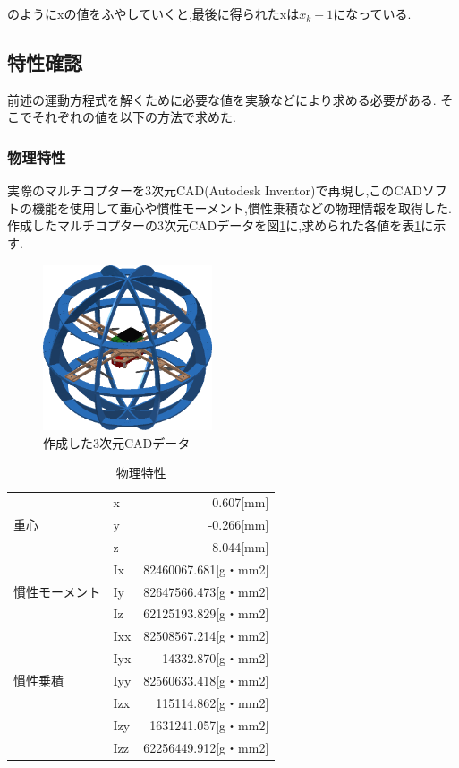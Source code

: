 \documentclass[12pt,oneside]{sotsuken_paper}
\begin{document}
のようにxの値をふやしていくと,最後に得られたxは\(x_k+1\)になっている.\cite{runge} 

\subsection{特性確認}
前述の運動方程式を解くために必要な値を実験などにより求める必要がある.
そこでそれぞれの値を以下の方法で求めた.

\subsubsection{物理特性}
実際のマルチコプターを3次元CAD(Autodesk Inventor)で再現し,このCADソフトの機能を使用して重心や慣性モーメント,慣性乗積などの物理情報を取得した.
作成したマルチコプターの3次元CADデータを図\ref{fig:3DCAD}に,求められた各値を表\ref{table:phy}に示す.

\begin{figure}[htbp]
	\begin{center}
		\includegraphics[width=50mm]{image/3DCAD.jpg}
		\caption{作成した3次元CADデータ}
		\label{fig:3DCAD}
	\end{center}
\end{figure}

\begin{table}[htbp]
	\begin{center}
		\caption{物理特性}
		\begin{tabular}{|l|l|r|} \hline
			 & x & 0.607[mm]\\
			重心 & y & -0.266[mm]\\
			 & z & 8.044[mm]\\\hline
			　& Ix & 82460067.681[g・mm2]\\
			慣性モーメント & Iy & 82647566.473[g・mm2]\\
			 & Iz & 62125193.829[g・mm2]\\\hline
			 & Ixx & 82508567.214[g・mm2]\\
			 & Iyx & 14332.870[g・mm2]\\
			慣性乗積 & Iyy & 82560633.418[g・mm2]\\
			 & Izx & 115114.862[g・mm2]\\
			 & Izy & 1631241.057[g・mm2]\\
			 & Izz & 62256449.912[g・mm2]\\\hline
		\end{tabular}
		\label{table:phy}
	\end{center}
\end{table}
\end{document}
